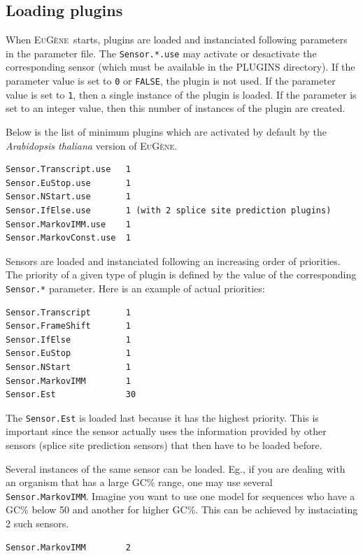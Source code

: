 \documentclass[a4paper,titlepage]{report}
\newcommand{\EuGene}{\textsc{EuG\`ene}}
\begin{document}
\subsection{Loading plugins}

When \EuGene\ starts, plugins are loaded and instanciated following
parameters in the parameter file. The \texttt{Sensor.*.use} may
activate or desactivate the corresponding sensor (which must be
available in the PLUGINS directory). If the parameter value is set to
\texttt{0} or \texttt{FALSE}, the plugin is not used. If the parameter
value is set to \texttt{1}, then a single instance of the plugin is
loaded. If the parameter is set to an integer value, then this number
of instances of the plugin are created.

Below is the list of minimum plugins which are activated by default by
the \emph{Arabidopsis thaliana} version of \EuGene.

\begin{Verbatim}
Sensor.Transcript.use   1
Sensor.EuStop.use       1
Sensor.NStart.use       1
Sensor.IfElse.use       1 (with 2 splice site prediction plugins)
Sensor.MarkovIMM.use    1
Sensor.MarkovConst.use  1
\end{Verbatim}  

Sensors are loaded and instanciated following an increasing order of
priorities. The priority of a given type of plugin is defined by the
value of the corresponding \texttt{Sensor.*} parameter. Here is an
example of actual priorities:

\begin{Verbatim}
Sensor.Transcript       1
Sensor.FrameShift       1
Sensor.IfElse           1
Sensor.EuStop           1       
Sensor.NStart           1       
Sensor.MarkovIMM        1 
Sensor.Est              30         
\end{Verbatim}

The \texttt{Sensor.Est} is loaded last because it has the highest
priority.  This is important since the sensor actually uses the
information provided by other sensors (splice site prediction sensors)
that then have to be loaded before.

Several instances of the same sensor can be loaded. Eg., if you are
dealing with an organism that has a large GC\% range, one may use
several \texttt{Sensor.MarkovIMM}. Imagine you want to use one model
for sequences who have a GC\% below 50 and another for higher GC\%.
This can be achieved by instaciating 2 such sensors. 

\begin{Verbatim}
Sensor.MarkovIMM        2
\end{Verbatim}
\end{document}
